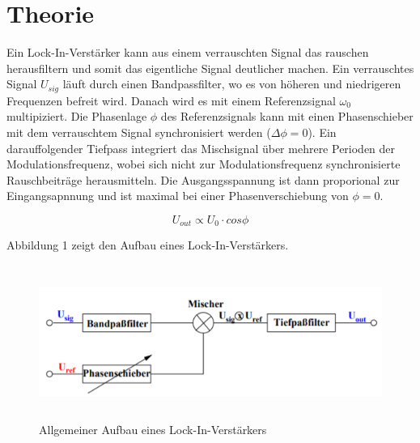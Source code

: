 \section{Theorie}
\label{sec:Theorie}

Ein Lock-In-Verstärker kann aus einem verrauschten Signal das rauschen herausfiltern und somit
das eigentliche Signal deutlicher machen. Ein verrauschtes Signal $U_{sig}$ läuft durch einen Bandpassfilter, wo es
von höheren und niedrigeren Frequenzen befreit wird. Danach wird es mit einem Referenzsignal $\omega_0$
multipiziert. Die Phasenlage $\phi$ des Referenzsignals kann mit einen Phasenschieber mit dem
verrauschtem Signal synchronisiert werden ($\Delta \phi = 0$). Ein darauffolgender Tiefpass integriert das Mischsignal
über mehrere Perioden der Modulationsfrequenz, wobei sich nicht zur Modulationsfrequenz synchronisierte Rauschbeiträge herausmitteln.
Die Ausgangsspannung ist dann proporional zur Eingangsapnnung und ist maximal bei einer Phasenverschiebung von $\phi = 0$.

\begin{equation}
  U_{out} \propto U_0 \cdot cos{\phi}
\end{equation}


Abbildung 1 zeigt den Aufbau eines Lock-In-Verstärkers.

\begin{figure}[H]
  \centering
  \includegraphics[height=5cm]{Lock.PNG}
  \caption{Allgemeiner Aufbau eines Lock-In-Verstärkers}
  \label{fig:Lock}
\end{figure}
